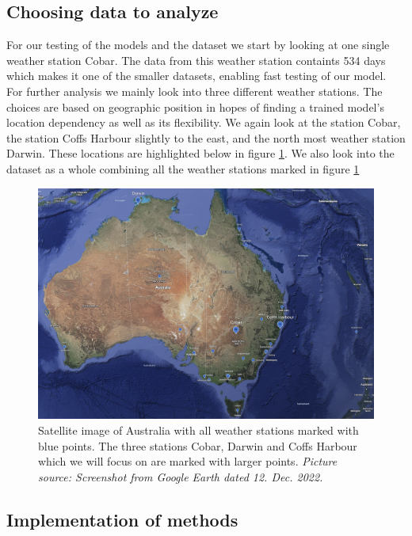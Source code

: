 \documentclass[11pt]{article}
\begin{document}
\subsection{Choosing data to analyze} %
\label{sub:Weather stations}
For our testing of the models and the dataset we start by looking at one single weather station Cobar. The data from this weather station containts 534 days which makes it one of the smaller datasets, enabling fast testing of our model. For further analysis we mainly look into three different weather stations. The choices are based on geographic position in hopes of finding a trained model's location dependency as well as its flexibility. We again look at the station Cobar, the station Coffs Harbour slightly to the east, and the north most weather station Darwin. These locations are highlighted below in figure \ref{fig:earth}. We also look into the dataset as a whole combining all the weather stations marked in figure \ref{fig:earth}
\begin{figure}[H]
    \centering
    \includegraphics[width=\textwidth]{../figures/earth.png}
    \caption{Satellite image of Australia with all weather stations marked with blue points. The three stations Cobar, Darwin and Coffs Harbour which we will focus on are marked with larger points. \textit{Picture source: Screenshot from Google Earth dated 12. Dec. 2022.}}
    \label{fig:earth}
\end{figure}

\subsection{Implementation of methods} %
\end{document}
